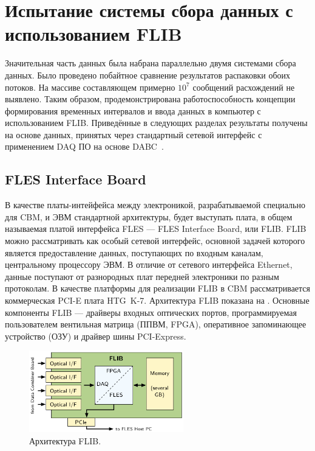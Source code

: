 \section{Испытание системы сбора данных с использованием FLIB}\label{sec:secFlibTests}

Значительная часть данных была набрана параллельно двумя системами сбора данных. Было проведено побайтное сравнение результатов распаковки обоих потоков. На массиве составляющем примерно $ 10^{7} $ сообщений расхождений не выявлено. Таким образом, продемонстрирована работоспособность концепции формирования временных интервалов и ввода данных в компьютер с использованием FLIB. Приведённые в следующих разделах результаты получены на основе данных, принятых через стандартный сетевой интерфейс с применением DAQ ПО на основе DABC~\cite{DABC}.

\subsection{FLES Interface Board}\label{sec:secFlib}

В качестве платы-интейфейса между электроникой, разрабатываемой специально для CBM, и ЭВМ стандартной архитектуры, будет выступать плата, в общем называемая платой интерфейса FLES --- FLES Interface Board, или FLIB. FLIB можно рассматривать как особый сетевой интерфейс, основной задачей которого является предоставление данных, поступающих по входным каналам, центральному процессору ЭВМ. В отличие от сетевого интерфейса Ethernet, данные поступают от разнородных плат передней электроники по разным протоколам. В качестве платформы для реализации FLIB в CBM рассматривается коммерческая PCI-E плата HTG~K-7. Архитектура FLIB показана на . Основные компоненты FLIB --- драйверы входных оптических портов, программируемая пользователем вентильная матрица (ППВМ, FPGA), оперативное запоминающее устройство (ОЗУ) и драйвер шины PCI-Express. 

\begin{figure}[H]
\centering
\includegraphics[width=0.6\textwidth]{pictures/FLIBarch.png}
\caption{Архитектура FLIB.}
\label{fig:FLIBarch}
\end{figure}